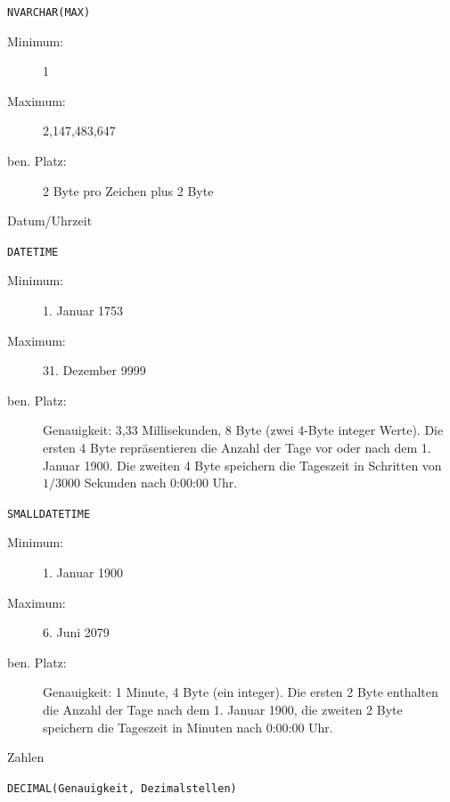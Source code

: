 \documentclass[12pt,ngerman,a4paper,index=totoc,twoside]{scrartcl}
\newcommand{\sql}[1]{\texttt{#1}}
\begin{document}
\begin{compactitem}
\begin{compactitem}
  \item \sql{NVARCHAR(MAX)} 

   \begin{description}
  	\item[Minimum:] 1
  	\item[Maximum:] 2,147,483,647
  	\item[ben. Platz:] 2 Byte pro Zeichen plus 2 Byte
  \end{description}	


  \end{compactitem}

 \item Datum/Uhrzeit
 \begin{compactitem}
 \item \sql{DATETIME}  

  \begin{description}
  	\item[Minimum:] 1. Januar 1753
  	\item[Maximum:] 31. Dezember 9999
  	\item[ben. Platz:] Genauigkeit: 3,33 Millisekunden, 8 Byte (zwei 4-Byte integer Werte). Die ersten 4 Byte repräsentieren die Anzahl der Tage vor oder nach dem 1. Januar 1900. Die zweiten 4 Byte speichern die Tageszeit in Schritten von $1/3000$ Sekunden nach 0:00:00 Uhr. 
  \end{description}	
 \item \sql{SMALLDATETIME} 

  \begin{description}
  	\item[Minimum:] 1. Januar 1900
  	\item[Maximum:] 6. Juni 2079
  	\item[ben. Platz:] Genauigkeit: 1 Minute, 4 Byte (ein integer). Die ersten 2 Byte enthalten die Anzahl der Tage nach dem 1. Januar 1900, die zweiten 2 Byte speichern die Tageszeit in Minuten nach 0:00:00 Uhr. 
  \end{description}	

\end{compactitem}

 \item Zahlen
\begin{compactitem}
 \item \sql{DECIMAL(Genauigkeit, Dezimalstellen)} 
  


\end{compactitem}
\end{compactitem}
\end{document}
